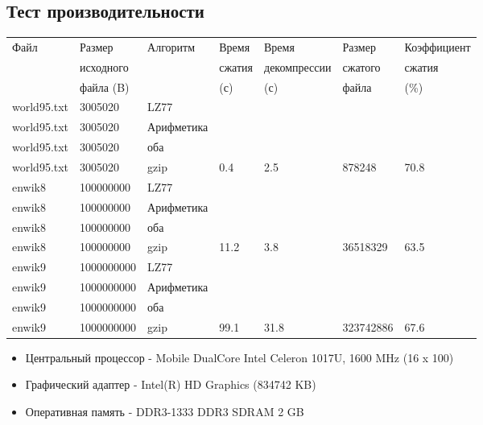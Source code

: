 \documentclass[12pt]{article}
\begin{document}
\subsection*{Тест производительности}%

\noindent
\begin{tabular}{| l | l | l | l | l | l | l |}
	\hline
	Файл             & Размер 	  & Алгоритм   & Время  & Время        & Размер  & Коэффициент \\
	                 & исходного  &            & сжатия & декомпрессии & сжатого & сжатия      \\
	                 & файла (B)  &            & (с)    & (с)          & файла   &	(\%)     \\
	\hline
	world95.txt      & 3005020    & LZ77       & & & &\\
	\hline
	world95.txt      & 3005020    & Арифметика & & & &\\
	\hline
	world95.txt      & 3005020    & оба        & & & &\\
	\hline
	world95.txt      & 3005020    & gzip       & 0.4 & 2.5 & 878248 & 70.8\\
	\hline
	enwik8           & 100000000  & LZ77       & & & &\\
	\hline
	enwik8           & 100000000  & Арифметика & & & &\\
	\hline
	enwik8           & 100000000  & оба        & & & &\\
	\hline
	enwik8           & 100000000  & gzip       & 11.2 & 3.8 & 36518329 & 63.5\\
	\hline
	enwik9           & 1000000000 & LZ77       & & & &\\
	\hline
	enwik9           & 1000000000 & Арифметика & & & &\\
	\hline
	enwik9           & 1000000000 & оба        & & & &\\
	\hline
	enwik9           & 1000000000 & gzip       & 99.1 & 31.8 & 323742886 & 67.6\\
	\hline
	

\end{tabular}

\begin{itemize}
	\item Центральный процессор - Mobile DualCore Intel Celeron 1017U, 1600 MHz (16 x 100)
	\item Графический адаптер - Intel(R) HD Graphics (834742 KB)
	\item Оперативная память - DDR3-1333 DDR3 SDRAM 2 GB
\end{itemize}
\end{document}
